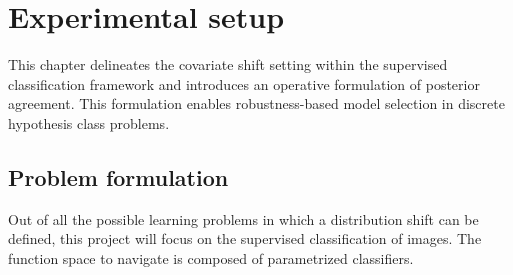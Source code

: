 \chapter{Experimental setup}\label{sec:experimental_setup}

This chapter delineates the covariate shift setting within the 
supervised classification framework and introduces an operative
formulation of posterior agreement. This formulation enables
robustness-based model selection in discrete hypothesis class problems.


\section{Problem formulation}

Out of all the possible learning problems in which a distribution shift
can be defined, this project will focus on the supervised classification
of images. The function space to navigate is composed of parametrized
classifiers.

